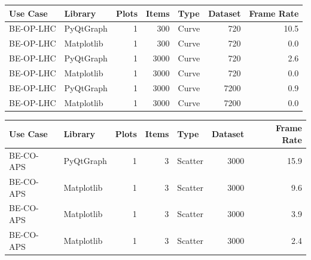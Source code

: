 \begin{table}[h]
\begin{center}
\begin{tabular}{llrrlrr}
\end{tabular}
\end{center}
\end{table}


\begin{table}[h]
\begin{center}

\label{tab:application:usecases:results:lhc}

\begin{tabular}{llrrlrr}

\hline
Use Case  & Library    & Plots & Items & Type    & Dataset & Frame Rate  \\
\hline
BE-OP-LHC & PyQtGraph  & 1     & 300   & Curve   & 720     & 10.5        \\
BE-OP-LHC & Matplotlib & 1     & 300   & Curve   & 720     & 0.0         \\
BE-OP-LHC & PyQtGraph  & 1     & 3000  & Curve   & 720     & 2.6         \\
BE-OP-LHC & Matplotlib & 1     & 3000  & Curve   & 720     & 0.0         \\
BE-OP-LHC & PyQtGraph  & 1     & 3000  & Curve   & 7200    & 0.9         \\
BE-OP-LHC & Matplotlib & 1     & 3000  & Curve   & 7200    & 0.0         \\
\hline

\end{tabular}
\end{center}
\end{table}


\begin{table}[h]
\begin{center}

\label{tab:application:usecases:results:aps}

\begin{tabular}{llrrlrr}

\hline
Use Case  & Library    & Plots & Items & Type    & Dataset & Frame Rate  \\
\hline
BE-CO-APS & PyQtGraph  & 1     & 3     & Scatter & 3000    & 15.9        \\
BE-CO-APS & Matplotlib & 1     & 3     & Scatter & 3000    & 9.6         \\
BE-CO-APS & Matplotlib & 1     & 3     & Scatter & 3000    & 3.9         \\
BE-CO-APS & Matplotlib & 1     & 3     & Scatter & 3000    & 2.4         \\
\hline

\end{tabular}
\end{center}
\end{table}

